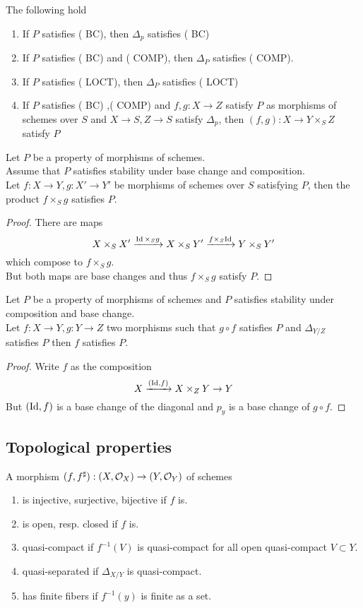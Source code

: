 \documentclass[../main.tex]{subfiles}
\begin{document}
\begin{lemma}
The following hold
\begin{enumerate}
\item If $P$ satisfies ( BC), then $\Delta_p$ satisfies ( BC) 
\item If $P$ satisfies ( BC) and ( COMP), then $\Delta_P$ satisfies ( COMP).
\item If $P$ satisfies ( LOCT), then $\Delta_P$ satisfies ( LOCT)
\item If $P$ satisfies ( BC) ,( COMP) and $f,g:X\to Z$ satisfy $P$ as morphisms of schemes over $S$ and $X\to S, Z\to S$ satisfy $\Delta_p$, then $( f,g) :X\to Y\times_S Z$ satisfy $P$ 
\end{enumerate}
\end{lemma}
\begin{lemma}
Let $P$ be a property of morphisms of schemes.\\
Assume that $P$ satisfies stability under base change and composition.\\
Let $f:X\to Y, g:X'\to Y'$ be morphisms of schemes over $S$ satisfying $P$, then the product $f\times_S g$ satisfies $P$.
\end{lemma}
\begin{proof}
There are maps
\[ 
	X\times_S X' \xrightarrow{\operatorname{Id}\times_S g} X\times_S Y' \xrightarrow{f\times_S \operatorname{Id}} Y \times_S Y'
\]
which compose to $f\times_S g$.\\
But both maps are base changes and thus $f\times_S g$ satisfy $P$.
\end{proof}
\begin{thm}
	Let $P$ be a property of morphisms of schemes and $P$ satisfies stability under composition and base change.\\
	Let $f:X\to Y, g:Y\to Z$ two morphisms such that $g\circ f$ satisfies $P$ and $\Delta_{Y /Z} $ satisfies $P$ then $f$ satisfies $P$.
\end{thm}
\begin{proof}
Write $f$ as the composition
\[ 
	X\xrightarrow{( \operatorname{Id},f) } X\times_Z Y \to Y
\]
But $( \operatorname{Id},f) $ is a base change of the diagonal and $p_y$ is a base change of $g\circ f$.

\end{proof}
\subsection{Topological properties}
\begin{defn}
	A morphism $( f,f^{\sharp}) :( X,\mathcal{O}_X) \to ( Y,\mathcal{O}_Y) $ of schemes
	\begin{enumerate}
	\item is injective, surjective, bijective if $f$ is.
	\item is open, resp. closed if $f$ is.
	\item quasi-compact if $f^{-1}( V)$ is quasi-compact for all open quasi-compact $V \subset Y$.
	\item quasi-separated if $\Delta_{X /Y} $ is quasi-compact.
	\item has finite fibers if $f^{-1}( y) $ is finite as a set.
	\end{enumerate}
	
\end{defn}
\end{document}
